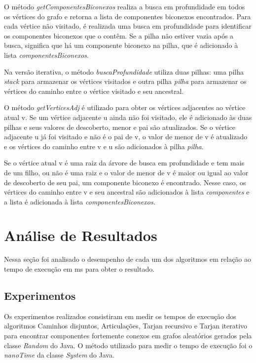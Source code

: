 O método \textit{getComponentesBiconexos} realiza a busca em profundidade em todos os vértices do grafo e retorna a lista de componentes biconexos encontrados. Para cada vértice não visitado, é realizada uma busca em profundidade para identificar os componentes biconexos que o contêm. Se a pilha não estiver vazia após a busca, significa que há um componente biconexo na pilha, que é adicionado à lista \textit{componentesBiconexos}.


Na versão iterativa, o método  \textit{buscaProfundidade} utiliza duas pilhas: uma pilha \textit{stack} para armazenar os vértices visitados e outra pilha \textit{pilha} para armazenar os vértices do caminho entre o vértice visitado e seu ancestral.

O método \textit{getVerticesAdj} é utilizado para obter os vértices adjacentes ao vértice atual v. Se um vértice adjacente u ainda não foi visitado, ele é adicionado às duas pilhas e seus valores de descoberto, menor e pai são atualizados. Se o vértice adjacente u já foi visitado e não é o pai de v, o valor de menor de v é atualizado e os vértices do caminho entre v e u são adicionados à pilha \textit{pilha}.

Se o vértice atual v é uma raiz da árvore de busca em profundidade e tem mais de um filho, ou não é uma raiz e o valor de menor de v é maior ou igual ao valor de descoberto de seu pai, um componente biconexo é encontrado. Nesse caso, os vértices do caminho entre v e seu ancestral são adicionados à lista \textit{componentes} e a lista é adicionada à lista \textit{componentesBiconexos}.


\section{\esp Análise de Resultados}
Nessa seção foi analisado o desempenho de cada um dos algoritmos em relação ao tempo de execução em ms para obter o resultado.


\subsection{\esp Experimentos}

Os experimentos realizados consistiram em medir os tempos de execução dos algoritmos Caminhos disjuntos, Articulações, Tarjan recursivo e Tarjan iterativo para encontrar componentes fortemente conexos em grafos aleatórios gerados pela classe \textit{Random} do Java. O método utilizado para medir o tempo de execução foi o \textit{nanoTime} da classe \textit{System} do Java.

